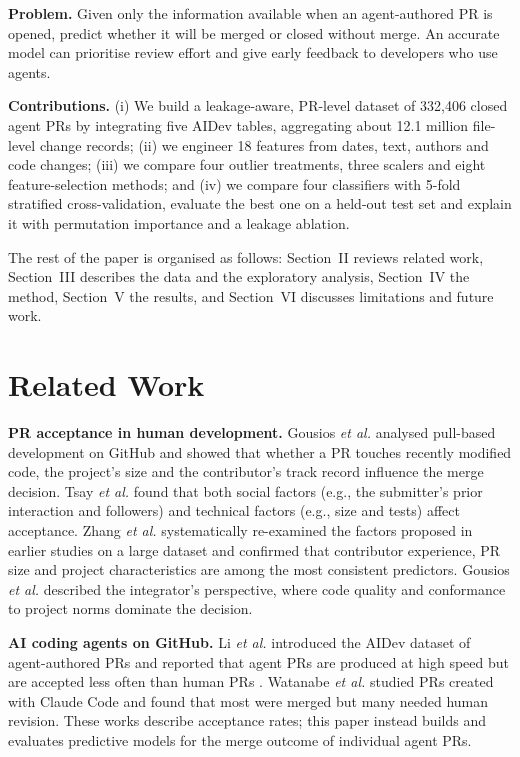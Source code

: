 \documentclass[conference]{IEEEtran}
\begin{document}
\textbf{Problem.} Given only the information available when an agent-authored PR is opened, predict whether it will be merged or closed without merge. An accurate model can prioritise review effort and give early feedback to developers who use agents.

\textbf{Contributions.} (i) We build a leakage-aware, PR-level dataset of 332,406 closed agent PRs by integrating five AIDev tables, aggregating about 12.1 million file-level change records; (ii) we engineer 18 features from dates, text, authors and code changes; (iii) we compare four outlier treatments, three scalers and eight feature-selection methods; and (iv) we compare four classifiers with 5-fold stratified cross-validation, evaluate the best one on a held-out test set and explain it with permutation importance and a leakage ablation.

The rest of the paper is organised as follows: Section~II reviews related work, Section~III describes the data and the exploratory analysis, Section~IV the method, Section~V the results, and Section~VI discusses limitations and future work.

\section{Related Work}
\textbf{PR acceptance in human development.} Gousios \textit{et al.} \cite{gousios2014exploratory} analysed pull-based development on GitHub and showed that whether a PR touches recently modified code, the project's size and the contributor's track record influence the merge decision. Tsay \textit{et al.} \cite{tsay2014influence} found that both social factors (e.g., the submitter's prior interaction and followers) and technical factors (e.g., size and tests) affect acceptance. Zhang \textit{et al.} \cite{zhang2022pull} systematically re-examined the factors proposed in earlier studies on a large dataset and confirmed that contributor experience, PR size and project characteristics are among the most consistent predictors. Gousios \textit{et al.} \cite{gousios2015work} described the integrator's perspective, where code quality and conformance to project norms dominate the decision.

\textbf{AI coding agents on GitHub.} Li \textit{et al.} introduced the AIDev dataset of agent-authored PRs and reported that agent PRs are produced at high speed but are accepted less often than human PRs \cite{li2025rise, li2026aidev}. Watanabe \textit{et al.} \cite{watanabe2025agentic} studied PRs created with Claude Code and found that most were merged but many needed human revision. These works describe acceptance rates; this paper instead builds and evaluates predictive models for the merge outcome of individual agent PRs.
\end{document}

